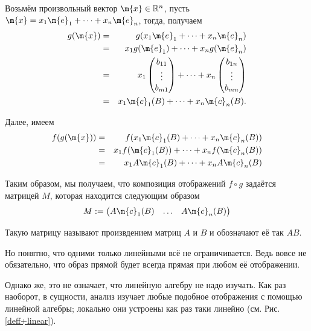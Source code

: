 Возьмём произвольный вектор $\m{x} \in \mathbb{R}^n$, пусть $\m{x} = x_1 \m{e}_1 + \cdots + x_n \m{e}_n$, тогда, получаем
\begin{eqnarray*}
    g(\m{x}) &=& g(x_1 \m{e}_1 + \cdots + x_n \m{e}_n) \\
    &=& x_1 g(\m{e}_1) + \cdots + x_n g(\m{e}_n) \\
    &=& x_1 \begin{pmatrix}
     b_{11} \\ \vdots \\ b_{m1}
 \end{pmatrix} + \cdots + x_n \begin{pmatrix}
     b_{1n} \\ \vdots \\ b_{mn}
 \end{pmatrix} \\
 &=& x_1 \m{c}_1(B) + \cdots + x_n \m{c}_n(B).
\end{eqnarray*}

Далее, имеем
\begin{eqnarray*}
    f(g(\m{x})) &=& f(x_1 \m{c}_1(B) + \cdots + x_n \m{c}_n(B)) \\
    &=& x_1 f(\m{c}_1(B)) + \cdots + x_n f(\m{c}_n(B)) \\
    &=& x_1 A\m{c}_1(B) + \cdots + x_n A\m{c}_n(B)
\end{eqnarray*}

Таким образом, мы получаем, что композиция отображений $f\circ g$ задаётся матрицей $M$, которая находится следующим образом
\[
 M: = \begin{pmatrix}
     A\m{c}_1(B) & \ldots & A\m{c}_n(B)
 \end{pmatrix}
\]

\begin{definition}
  Такую матрицу называют произвдением матриц $A$ и $B$ и обозначают её так $AB$.
\end{definition}

Но понятно, что одними только линейными всё не ограничивается. Ведь вовсе не обязательно, что образ прямой будет всегда прямая при любом её отображении.

Однако же, это не означает, что линейную алгебру не надо изучать. Как раз наоборот, в сущности, анализ изучает любые подобное отображения с помощью линейной алгебры; локально они устроены как раз таки линейно (см. Рис.\ref{deff+linear}).

